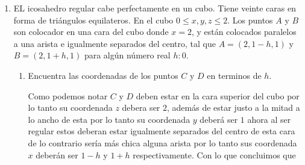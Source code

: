 \documentclass[letterpaper]{article}
\theoremstyle{definition}
\theoremstyle{lemathm}
\theoremstyle{lemathm}
\theoremstyle{lemathm}
\theoremstyle{lemademthm}
\newcommand{\abs}[1]{\left| #1 \right| }
\newcommand{\pars}[1]{\left( #1 \right) }
\newcommand{\inprod}[1]{\left\langle #1 \right\rangle }
\newcommand{\norm}[1]{\left\lVert#1\right\rVert}
\newcommand{\1}{\mathbbm{1}}
\begin{document}
\begin{enumerate}
\begin{enumerate}
\begin{proof}
				\begin{align*}
					\abs{\inprod{\vec{x},\vec{y}}} &= \abs{\inprod{\vec{x},\lambda\vec{x}}} &\text{Por ser linealmente dependientes $\vec{x}$ y $\vec{y}$}\\
					&= \abs{\lambda}\abs{\inprod{\vec{x},\vec{x}}} &\text{Por linealidad del producto punto}\\
					& &\text{y homogeneidad del valor absoluto}\\
					&= \abs{\lambda}\norm{x}\norm{x} &\text{Por relación producto punto y norma}\\
					&= \norm{x}\norm{\lambda x} &\text{Por homogeneidad de la norma}\\
					&= \norm{x}\norm{y}\\
				\end{align*}

				Ahora si $\abs{\inprod{\vec{x},\vec{y}}} = \norm{\vec{x}}\norm{\vec{y}}$ entonces por linealidad del producto punto obtenemos

				\[\abs{\inprod{\frac{\vec{x}}{\norm{x}}, \frac{\vec{y}}{\norm{y}}}} = 1.\]

				por el lema 1 tenemos

				\[\frac{\vec{x}}{\norm{x}} = \frac{\vec{y}}{\norm{y}}.\]

				por lo tanto concluimos

				\[\vec{x} = \frac{\norm{x}}{\norm{y}} \vec{y},\]

				es decir $x$ y $y$ son linealmente dependientes.
			\end{proof}
		\end{enumerate}

		\item EL icosahedro regular cabe perfectamente en un cubo. Tiene veinte caras en forma de triángulos equilateros. En el cubo $0\leq x,y,z\leq 2$. Los puntos $A$ y $B$ son colocador en una cara del cubo donde $x = 2$, y están colocados paralelos a una arista e igualmente separados del centro, tal que $A = \pars{2,1-h,1}$ y $B = \pars{2,1+h,1}$ para algún número real $h:0$.
		
		\begin{enumerate}
			\item Encuentra las coordenadas de los puntos $C$ y $D$ en terminos de $h$.
			
			Como podemos notar $C$ y $D$ deben estar en la cara superior del cubo por lo tanto su coordenada $z$ debera ser $2$, además de estar justo a la mitad a lo ancho de esta por lo tanto su coordenada $y$ deberá ser $1$ ahora al ser regular estos deberan estar igualmente separados del centro de esta cara de lo contrario sería más chica alguna arista por lo tanto sus coordenada $x$ deberán ser $1-h$ y $1+h$ respectivamente. Con lo que concluimos que


\end{enumerate}
\end{enumerate}
\end{document}
